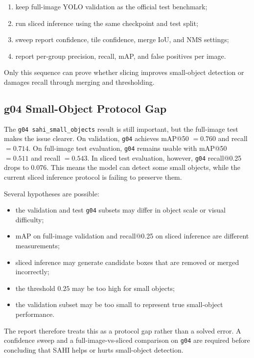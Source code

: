 \documentclass[12pt,a4paper]{report}
\newcommand{\code}[1]{\texttt{#1}}
\begin{document}
\begin{enumerate}
    \item keep full-image YOLO validation as the official test benchmark;
    \item run sliced inference using the same checkpoint and test split;
    \item sweep report confidence, tile confidence, merge IoU, and NMS settings;
    \item report per-group precision, recall, mAP, and false positives per image.
\end{enumerate}

Only this sequence can prove whether slicing improves small-object detection or damages recall through merging and thresholding.

\subsection{g04 Small-Object Protocol Gap}
The \code{g04 sahi\_small\_objects} result is still important, but the full-image test makes the issue clearer. On validation, \code{g04} achieves mAP@50 \(=0.760\) and recall \(=0.714\). On full-image test evaluation, \code{g04} remains usable with mAP@50 \(=0.511\) and recall \(=0.543\). In sliced test evaluation, however, \code{g04} recall@0.25 drops to \(0.076\). This means the model can detect some small objects, while the current sliced inference protocol is failing to preserve them.

Several hypotheses are possible:

\begin{itemize}
    \item the validation and test \code{g04} subsets may differ in object scale or visual difficulty;
    \item mAP on full-image validation and recall@0.25 on sliced inference are different measurements;
    \item sliced inference may generate candidate boxes that are removed or merged incorrectly;
    \item the threshold \(0.25\) may be too high for small objects;
    \item the validation subset may be too small to represent true small-object performance.
\end{itemize}

The report therefore treats this as a protocol gap rather than a solved error. A confidence sweep and a full-image-vs-sliced comparison on \code{g04} are required before concluding that SAHI helps or hurts small-object detection.
\end{document}
